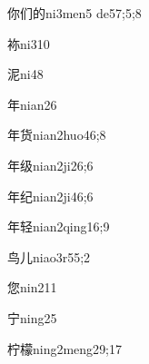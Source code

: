 \begin{verbete}{你们的}{ni3men5 de5}{7;5;8}
\end{verbete}

\begin{verbete}{袮}{ni3}{10}
\end{verbete}

\begin{verbete}{泥}{ni4}{8}
\end{verbete}

\begin{verbete}{年}{nian2}{6}
\end{verbete}

\begin{verbete}{年货}{nian2huo4}{6;8}
\end{verbete}

\begin{verbete}{年级}{nian2ji2}{6;6}
\end{verbete}

\begin{verbete}{年纪}{nian2ji4}{6;6}
\end{verbete}

\begin{verbete}{年轻}{nian2qing1}{6;9}
\end{verbete}

\begin{verbete}{鸟儿}{niao3r5}{5;2}
\end{verbete}

\begin{verbete}{您}{nin2}{11}
\end{verbete}

\begin{verbete}{宁}{ning2}{5}
\end{verbete}

\begin{verbete}{柠檬}{ning2meng2}{9;17}
\end{verbete}

